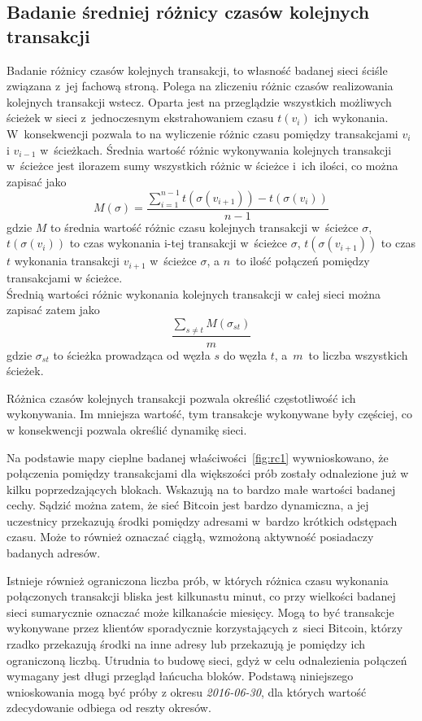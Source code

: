 \documentclass[12pt, twoside, final, openany]{mgr}
\begin{document}
\subsection{Badanie średniej różnicy czasów kolejnych transakcji}
\label{roznice_czasow}
\indent Badanie różnicy czasów kolejnych transakcji, to własność badanej sieci ściśle związana z~jej fachową stroną. Polega na zliczeniu różnic czasów realizowania kolejnych transakcji wstecz. Oparta jest na przeglądzie wszystkich możliwych ścieżek w sieci z~jednoczesnym ekstrahowaniem czasu $t(v_i)$ ich wykonania. W~konsekwencji pozwala to na wyliczenie różnic czasu pomiędzy transakcjami $v_i$ i $v_{i-1}$ w~ścieżkach. Średnia wartość różnic wykonywania kolejnych transakcji w~ścieżce jest ilorazem sumy wszystkich różnic w ścieżce i~ich ilości, co można zapisać jako
\begin{equation}
\label{eq:rckt1}
M(\sigma) = \frac{\sum_{i=1}^{n-1} t(\sigma(v_{i+1})) - t(\sigma(v_{i}))}{n-1}
\end{equation}
gdzie $M$ to średnia wartość różnic czasu kolejnych transakcji w~ścieżce $\sigma$, $t(\sigma(v_i))$ to czas wykonania i-tej transakcji w~ścieżce $\sigma$, $t(\sigma(v_{i+1}))$ to czas $t$ wykonania transakcji $v_{i+1}$ w~ścieżce $\sigma$, a $n$~to ilość połączeń pomiędzy transakcjami w ścieżce. 
\\ Średnią wartości różnic wykonania kolejnych transakcji w całej sieci można zapisać zatem jako
\begin{equation}
\label{eq:rckt2}
\frac{\sum_{s \ne t}^{} M(\sigma_{st})}{m}
\end{equation}
gdzie $\sigma_{st}$ to ścieżka prowadząca od węzła $s$ do węzła $t$, a~$m$~to liczba wszystkich ścieżek.

\indent Różnica czasów kolejnych transakcji pozwala określić 
częstotliwość ich wykonywania. Im mniejsza wartość, tym transakcje wykonywane były częściej, co w konsekwencji pozwala określić dynamikę sieci.

\indent Na podstawie mapy cieplne badanej właściwości~\ref{fig:rc1} wywnioskowano, że połączenia pomiędzy transakcjami dla większości prób zostały odnalezione już w kilku poprzedzających blokach. Wskazują na to bardzo małe wartości badanej cechy. Sądzić można zatem, że sieć Bitcoin jest bardzo dynamiczna, a jej uczestnicy przekazują środki pomiędzy adresami w~bardzo krótkich odstępach czasu. Może to również oznaczać ciągłą, wzmożoną aktywność posiadaczy badanych adresów.

\indent Istnieje również ograniczona liczba prób, w których różnica czasu wykonania połączonych transakcji bliska jest kilkunastu minut, co przy wielkości badanej sieci sumarycznie oznaczać może kilkanaście miesięcy. Mogą to być transakcje wykonywane przez klientów sporadycznie korzystających z~sieci Bitcoin, którzy rzadko przekazują środki na inne adresy lub przekazują je pomiędzy ich ograniczoną liczbą. Utrudnia to budowę sieci, gdyż w celu odnalezienia połączeń wymagany jest długi przegląd łańcucha bloków. Podstawą niniejszego wnioskowania mogą być próby z okresu \textit{2016-06-30}, dla których wartość zdecydowanie odbiega od reszty okresów. 
\end{document}
